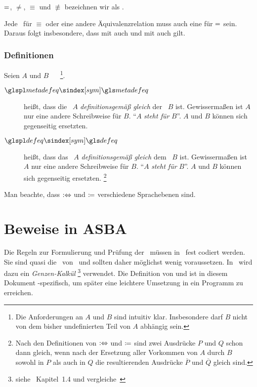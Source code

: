 $=$, $\ne$, $\equiv$ und $\nequiv$ bezeichnen wir als  .

Jede \interessierendeEigenschaft\ für $\equiv$ oder eine andere Äquivalenzrelation muss auch eine für $=$ sein.
Daraus folgt insbesondere, dass mit  auch  und mit  auch  gilt.

\subsubsection{Definitionen}%
\label{subsub:Definitionen}

Seien $A$ und $B$ \Aussagen\ \textbzw\ \Objekte%
\footnote{%
	Die Anforderungen an $A$ und $B$ sind intuitiv klar.
	Insbesondere darf $B$ nicht von dem bisher undefinierten Teil von $A$ abhängig sein.
}.
\begin{description}
	\item[$\glsSym{metadefeq}$] \label{def:Metadefinition}
	 heißt, dass die \Aussage\ $A$ \emph{definitionsgemäß gleich} der \Aussage\ $B$ ist.
	Gewissermaßen ist $A$ nur eine andere Schreibweise für $B$.
	\enquote{$A$ \emph{steht für} $B$}.
	$A$ und $B$ können sich gegenseitig ersetzten.
	\item[$\glsSym{defeq}$] \label{def:Definition}
	 heißt, dass das \Objekt\ $A$ \emph{definitionsgemäß gleich} dem \Objekt\ $B$ ist.
	Gewissermaßen ist $A$ nur eine andere Schreibweise für $B$.
	\enquote{$A$ \emph{steht für} $B$}.
	$A$ und $B$ können sich gegenseitig ersetzten.%
	\footnote{%
		Nach den Definitionen von $:\Leftrightarrow$ und $\coloneqq$ sind zwei Ausdrücke $P$ und $Q$ schon dann gleich, wenn nach der Ersetzung aller Vorkommen von $A$ durch $B$ sowohl in $P$ als auch in $Q$ die resultierenden Ausdrücke $\overline{P}$ und $\overline{Q}$ gleich sind.
	}
\end{description}
Man beachte, dass $:\Leftrightarrow$ und $\coloneqq$ verschiedene Sprachebenen sind.

\section{Beweise in ASBA}%
\label{sec:BeweiseASBA}

Die Regeln zur Formulierung und Prüfung der \Beweise\ müssen in \ASBA\ fest codiert werden.
Sie sind quasi die \Axiome\ von \ASBA\ und sollten daher möglichst wenig voraussetzen.
In \ASBA\ wird dazu ein \emph{Genzen-Kalkül}%
\footnote{%
	siehe~\cite{bib:Rautenberg} Kapitel~1.4 und vergleiche~\cite{bib:Schlussregel,bib:NatuerlichesSchliessen}
} verwendet.
Die Definition von \emph{\Schlussregel} und \emph{\Beweis} ist in diesem Dokument \ASBA-spezifisch, um später eine leichtere Umsetzung in ein Programm zu erreichen.


